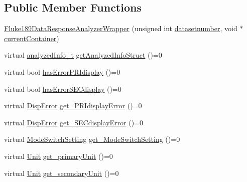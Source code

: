 \subsection*{Public Member Functions}
\begin{DoxyCompactItemize}
\item 
\hyperlink{classFluke_1_1Fluke189DataResponseAnalyzerWrapper_af4f891231353edf2c9a20743d3018b1e}{Fluke189DataResponseAnalyzerWrapper} (unsigned int \hyperlink{classFluke_1_1Fluke189DataResponseAnalyzerWrapper_a568ccec1349cc6b278fb0791182bc7b4}{datasetnumber}, void $\ast$\hyperlink{classFluke_1_1Fluke189DataResponseAnalyzerWrapper_aa0096243be3694f7993022733703697a}{currentContainer})
\item 
virtual \hyperlink{structFluke_1_1Fluke189DataResponseAnalyzerWrapper_1_1analyzedInfo__t}{analyzedInfo\_\-t} \hyperlink{classFluke_1_1Fluke189DataResponseAnalyzerWrapper_a006925b794ce1cd11ca13668fbcf5b64}{getAnalyzedInfoStruct} ()=0
\item 
virtual bool \hyperlink{classFluke_1_1Fluke189DataResponseAnalyzerWrapper_a25ca42185c5573fb30a6c60e72c36e27}{hasErrorPRIdisplay} ()=0
\item 
virtual bool \hyperlink{classFluke_1_1Fluke189DataResponseAnalyzerWrapper_a99952a4552f0cb6705996b28312850dc}{hasErrorSECdisplay} ()=0
\item 
virtual \hyperlink{classFluke_1_1Fluke189DataResponseAnalyzerWrapper_a5e26140c615bf0b73788f665a7bec9c7}{DispError} \hyperlink{classFluke_1_1Fluke189DataResponseAnalyzerWrapper_ae6b5bf434d9600f4178650d66922a3aa}{get\_\-PRIdisplayError} ()=0
\item 
virtual \hyperlink{classFluke_1_1Fluke189DataResponseAnalyzerWrapper_a5e26140c615bf0b73788f665a7bec9c7}{DispError} \hyperlink{classFluke_1_1Fluke189DataResponseAnalyzerWrapper_a28c8a2bcca43f33e1b1becf9d5ffa76c}{get\_\-SECdisplayError} ()=0
\item 
virtual \hyperlink{classFluke_1_1Fluke189DataResponseAnalyzerWrapper_a2ec2700a6086ae0ebd9601fe0c0f957a}{ModeSwitchSetting} \hyperlink{classFluke_1_1Fluke189DataResponseAnalyzerWrapper_a18e1b686e50a4cc3a7023c646f66a35c}{get\_\-ModeSwitchSetting} ()=0
\item 
virtual \hyperlink{classFluke_1_1Fluke189DataResponseAnalyzerWrapper_ab8e5f2306e4d2ad3d741d273793aaed1}{Unit} \hyperlink{classFluke_1_1Fluke189DataResponseAnalyzerWrapper_a81fd0f497095dba37f2a614bd35426db}{get\_\-primaryUnit} ()=0
\item 
virtual \hyperlink{classFluke_1_1Fluke189DataResponseAnalyzerWrapper_ab8e5f2306e4d2ad3d741d273793aaed1}{Unit} \hyperlink{classFluke_1_1Fluke189DataResponseAnalyzerWrapper_a8c24a1f3d5abae862ffa06a3a7ac44f1}{get\_\-secondaryUnit} ()=0

\end{DoxyCompactItemize}
